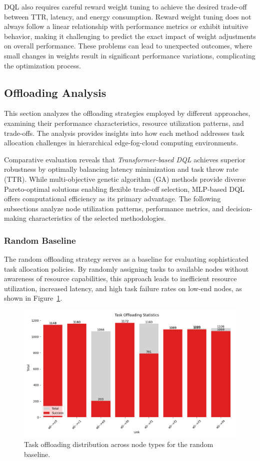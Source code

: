 \documentclass[preprint,3p,authoryear]{elsarticle}
\begin{document}
DQL also requires careful reward weight tuning to achieve the desired trade-off between TTR, latency, and energy consumption. Reward weight tuning does not always follow a linear relationship with performance metrics or exhibit intuitive behavior, making it challenging to predict the exact impact of weight adjustments on overall performance. These problems can lead to unexpected outcomes, where small changes in weights result in significant performance variations, complicating the optimization process.

\subsection{Offloading Analysis}\label{subsec:offloading-analysis}

This section analyzes the offloading strategies employed by different approaches, examining their performance characteristics, resource utilization patterns, and trade-offs. The analysis provides insights into how each method addresses task allocation challenges in hierarchical edge-fog-cloud computing environments.

Comparative evaluation reveals that \emph{Transformer-based DQL} achieves superior robustness by optimally balancing latency minimization and task throw rate (TTR). While multi-objective genetic algorithm (GA) methods provide diverse Pareto-optimal solutions enabling flexible trade-off selection, MLP-based DQL offers computational efficiency as its primary advantage. The following subsections analyze node utilization patterns, performance metrics, and decision-making characteristics of the selected methodologies.

\subsubsection{Random Baseline}
\label{subsec:random}

The random offloading strategy serves as a baseline for evaluating sophisticated task allocation policies. By randomly assigning tasks to available nodes without awareness of resource capabilities, this approach leads to inefficient resource utilization, increased latency, and high task failure rates on low-end nodes, as shown in Figure~\ref{fig:random-task-offloading-stats}.

\begin{figure}[H]
    \centering
    \includegraphics[width=0.5\linewidth]{figs/Random/task_offloading_statistics.png}
    \caption{Task offloading distribution across node types for the random baseline.}
    \label{fig:random-task-offloading-stats}
\end{figure}
\end{document}
